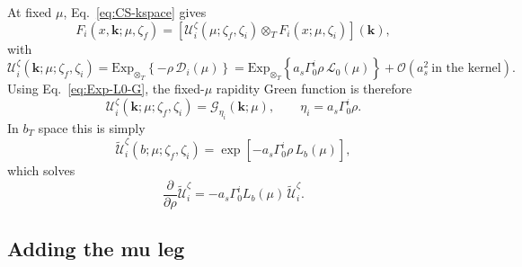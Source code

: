 \documentclass[11pt]{article}
\newcommand{\bk}{\bm{k}}
\newcommand{\ot}{\otimes_T}
\newcommand{\order}[1]{\mathcal{O}\!\left(#1\right)}
\newcommand{\ExpT}{\mathrm{Exp}_{\otimes_T}}
\begin{document}
At fixed $\mu$, Eq.~\eqref{eq:CS-kspace} gives
\begin{equation}
  F_i(x,\bk;\mu,\zeta_f)
  =\left[\mathcal U_i^\zeta(\mu;\zeta_f,\zeta_i)\ot
  F_i(x;\mu,\zeta_i)\right](\bk),
  \label{eq:U-zeta-def-green-section}
\end{equation}
with
\begin{equation}
  \mathcal U_i^\zeta(\bk;\mu;\zeta_f,\zeta_i)
  =\ExpT\!\left\{-\rho\,\mathcal D_i(\mu)\right\}
  =\ExpT\!\left\{a_s\Gamma_0^i\rho\,\mathcal L_0(\mu)\right\}
  +\order{a_s^2\ \text{in the kernel}}.
  \label{eq:U-zeta-exp-green-section}
\end{equation}
Using Eq.~\eqref{eq:Exp-L0-G}, the fixed-$\mu$ rapidity Green function is therefore
\begin{equation}
  \boxed{
  \mathcal U_i^\zeta(\bk;\mu;\zeta_f,\zeta_i)
  =\mathcal G_{\eta_i}(\bk;\mu),
  \qquad
  \eta_i=a_s\Gamma_0^i\rho.
  }
  \label{eq:U-zeta-G-green-section}
\end{equation}
In $b_T$ space this is simply
\begin{equation}
  \widetilde{\mathcal U}_i^\zeta(b;\mu;\zeta_f,\zeta_i)
  =\exp\!\left[-a_s\Gamma_0^i\rho\,L_b(\mu)\right],
  \label{eq:U-zeta-b-green-section}
\end{equation}
which solves
\begin{equation}
  \frac{\partial}{\partial\rho}\widetilde{\mathcal U}_i^\zeta
  =-a_s\Gamma_0^iL_b(\mu)\,
  \widetilde{\mathcal U}_i^\zeta.
  \label{eq:U-zeta-diff-green-section}
\end{equation}

\subsection{Adding the mu leg}
\end{document}
